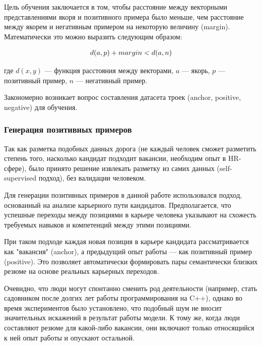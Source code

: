 \documentclass[14pt]{mmcs_article}
\begin{document}
Цель обучения заключается в том, чтобы расстояние между векторными представлениями якоря и позитивного примера было меньше, чем расстояние между якорем и негативным примером на некоторую величину (margin). Математически это можно выразить следующим образом:

\begin{equation*}
  \centering
  \allowdisplaybreaks[1]
  \begin{split}
    d(a,p) + margin < d(a,n)
  \end{split}
\end{equation*}

где $d(x,y)$ --- функция расстояния между векторами, $a$ --- якорь, $p$ --- позитивный пример, $n$ --- негативный пример.

Закономерно возникает вопрос составления датасета троек (anchor, positive, negative) для обучения.

\subsubsection{Генерация позитивных примеров}\label{positive_examples_generation}

Так как разметка подобных данных дорога (не каждый человек сможет разметить степень того, насколько кандидат подходит вакансии, необходим опыт в HR-сфере), было принято решение извлекать разметку из самих данных (self-supervised подход), без валидации человеком.

Для генерации позитивных примеров в данной работе использовался подход, основанный на анализе карьерного пути кандидатов. Предполагается, что успешные переходы между позициями в карьере человека указывают на схожесть требуемых навыков и компетенций между этими позициями.

При таком подходе каждая новая позиция в карьере кандидата рассматривается как "вакансия" (anchor), а предыдущий опыт работы --- как позитивный пример (positive). Это позволяет автоматически формировать пары семантически близких резюме на основе реальных карьерных переходов.

Очевидно, что люди могут спонтанно сменить род деятельности (например, стать садовником после долгих лет работы программирования на C++), однако во время экспериментов было установлено, что подобный шум не вносит значительных искажений в результат работы модели. К тому же, когда люди составляют резюме для какой-либо вакансии, они включают только относящийся к ней опыт работы и опускают остальной.
\end{document}
